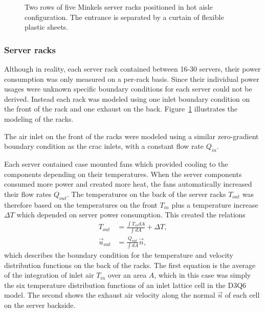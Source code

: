 \begin{figure}[!htb]
\centering
\begin{scriptsize} %
\def\svgwidth{\linewidth}

\end{scriptsize}
\caption{Two rows of five Minkels server racks positioned in hot aisle configuration. The entrance is separated by a curtain of flexible plastic sheets.}
\label{fig:racks}
\end{figure}

\subsubsection{Server racks}
Although in reality, each server rack contained between 16-30 servers, their power consumption was only measured on a per-rack basis. Since their individual power usages were unknown specific boundary conditions for each server could not be derived. Instead each rack was modeled using one inlet boundary condition on the front of the rack and one exhaust on the back. Figure~\ref{fig:racks} illustrates the modeling of the racks.

The air inlet on the front of the racks were modeled using a similar zero-gradient boundary condition as the \gls{crac} inlets, with a constant flow rate $Q_{in}$.

Each server contained case mounted fans which provided cooling to the components depending on their temperatures. When the server components consumed more power and created more heat, the fans automatically increased their flow rates $Q_{out}$. The temperatures on the back of the server racks $T_{out}$ was therefore based on the temperatures on the front $T_{in}$ plus a temperature increase $\Delta T$ which depended on server power consumption. This created the relations~\cites[pg.166]{Delbosc}
\begin{align}
T_{out} &= \frac{\int T_{in} dA}{\int dA} + \Delta T,\\
\vec{u}_{out} &= \frac{Q_{out}}{\int dA} \vec{n},
\end{align}
which describes the boundary condition for the temperature and velocity distribution functions on the back of the racks. The first equation is the average of the integration of inlet air $T_{in}$ over an area $A$, which in this case was simply the six temperature distribution functions of an inlet lattice cell in the D3Q6 model. The second shows the exhaust air velocity along the normal $\vec{n}$ of each cell on the server backside.

